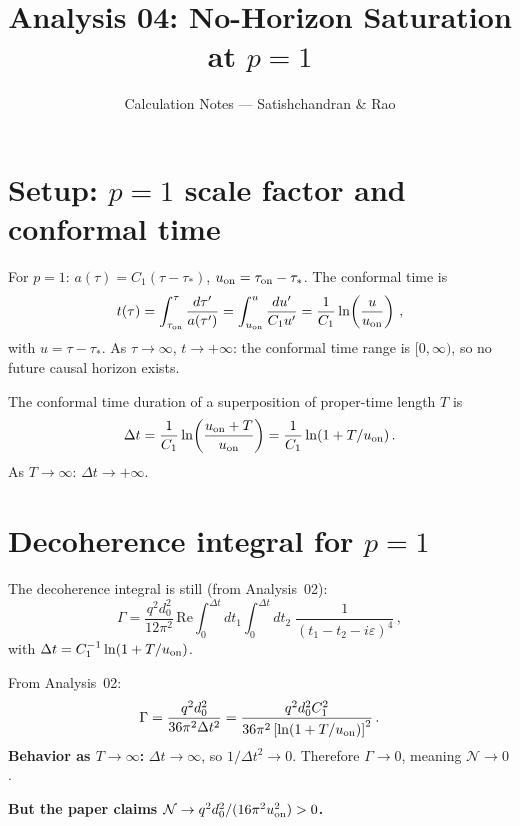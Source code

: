 \documentclass[12pt]{article}
\title{Analysis 04: No-Horizon Saturation at $p = 1$}
\author{Calculation Notes --- Satishchandran \& Rao}
\date{}
\newcommand{\Scfac}{a}
\newcommand{\Nnum}{\mathcal{N}}
\newcommand{\lb}{\left}
\newcommand{\rb}{\right}
\begin{document}
\maketitle

\section*{Setup: $p=1$ scale factor and conformal time}

For $p=1$: $\Scfac(\tau) = C_{1}(\tau-\tau_{*})$, $u_{\rm on} = \tau_{\rm on}-\tau_{*}$.
The conformal time is
%
\begin{equation}
  t(\tau) = \int_{\tau_{\rm on}}^{\tau}\frac{d\tau'}{\Scfac(\tau')}
  = \int_{u_{\rm on}}^{u}\frac{du'}{C_{1}u'}
  = \frac{1}{C_{1}}\ln\!\lb(\frac{u}{u_{\rm on}}\rb) \,,
\end{equation}
%
with $u = \tau-\tau_{*}$.  As $\tau\to\infty$, $t\to+\infty$: the conformal time
range is $[0,\infty)$, so no future causal horizon exists.

The conformal time duration of a superposition of proper-time length $T$ is
%
\begin{equation}
  \Delta t = \frac{1}{C_{1}}\ln\!\lb(\frac{u_{\rm on}+T}{u_{\rm on}}\rb)
  = \frac{1}{C_{1}}\ln(1+T/u_{\rm on}) \,.
\end{equation}
%
As $T\to\infty$: $\Delta t\to+\infty$.

\section*{Decoherence integral for $p=1$}

The decoherence integral is still (from Analysis~02):
%
\begin{equation}
  \Gamma = \frac{q^{2}d_{0}^{2}}{12\pi^{2}}
  \,\mathrm{Re}\int_{0}^{\Delta t}dt_{1}\int_{0}^{\Delta t}dt_{2}\;
  \frac{1}{(t_{1}-t_{2}-i\varepsilon)^{4}} \,,
\end{equation}
%
with $\Delta t = C_{1}^{-1}\ln(1+T/u_{\rm on})$.

From Analysis~02:
%
\begin{equation}
  \Gamma = \frac{q^{2}d_{0}^{2}}{36\pi^{2}\Delta t^{2}}
  = \frac{q^{2}d_{0}^{2}C_{1}^{2}}{36\pi^{2}\lb[\ln(1+T/u_{\rm on})\rb]^{2}} \,.
  \label{eq:Gamma-p1}
\end{equation}
%
\textbf{Behavior as $T\to\infty$:} $\Delta t\to\infty$, so $1/\Delta t^{2}\to 0$.
Therefore $\Gamma\to 0$, meaning $\Nnum\to 0$.

\medskip
\noindent\textbf{But the paper claims $\Nnum\to q^{2}d_{0}^{2}/(16\pi^{2}u_{\rm on}^{2})>0$.}
\end{document}
